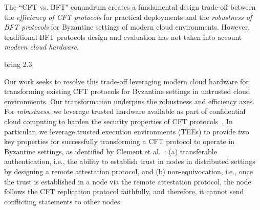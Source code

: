 The “CFT vs. BFT" conundrum creates a fundamental design trade-off between the {\em efficiency of CFT protocols} for practical deployments and the {\em robustness of BFT protocols} for Byzantine settings of modern cloud environments. However, traditional BFT protocols design and evaluation has not taken into account {\em modern cloud hardware}. 
 



bring 2.3

 Our work seeks to resolve this trade-off leveraging modern cloud hardware for transforming existing CFT protocols for Byzantine settings in untrusted cloud environments. Our transformation underpins the robustness and efficiency axes.
For {\em robustness}, we leverage trusted hardware available as part of confidential cloud computing to harden the security properties of CFT protocols~\cite{intel-sgx, keystone_eurosys, amd-sev, intelTDX}. In particular, we leverage trusted execution environments (TEEs) to provide two key properties for successfully transforming a CFT protocol to operate in Byzantine settings, as identified by Clement et al.~\cite{clement2012}: (a) transferable authentication, i.e., the ability to establish trust in nodes in distributed settings by designing a remote attestation protocol, and (b) non-equivocation, i.e., once the trust is established in a node via the remote attestation protocol, the node follows the CFT replication protocol faithfully, and therefore, it cannot send conflicting statements to other nodes. %

